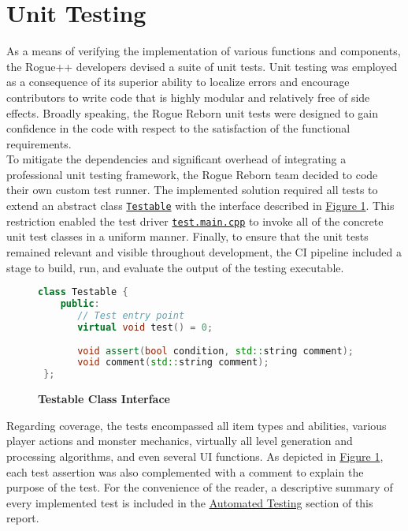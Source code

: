 \documentclass[12pt, titlepage]{article}
\newcommand{\newsection}[1]{\newpage\section{#1}}
\begin{document}
\newsection{Unit Testing} \label{Section_UT}
	As a means of verifying the implementation of various functions and components, the Rogue++ developers devised a suite of unit tests.  Unit testing was employed as a consequence of its superior ability to localize errors and encourage contributors to write code that is highly modular and relatively free of side effects.  Broadly speaking, the Rogue Reborn unit tests were designed to gain confidence in the code with respect to the satisfaction of the functional requirements.\\

	To mitigate the dependencies and significant overhead of integrating a professional unit testing framework, the Rogue Reborn team decided to code their own custom test runner.  The implemented solution required all tests to extend an abstract class \href{run:../../src/test.testable.h}{\lstinline$Testable$} with the interface described in \hyperref[Figure_Testable]{Figure 1}.  This restriction enabled the test driver \href{run:../../src/test.main.cpp}{\lstinline$test.main.cpp$} to invoke all of the concrete unit test classes in a uniform manner.  Finally, to ensure that the unit tests remained relevant and visible throughout development, the CI pipeline included a stage to build, run, and evaluate the output of the testing executable.

	\begin{figure}[H] \label{Figure_Testable}
		\caption{\bf Testable Class Interface}
		\centering
		\begin{lstlisting}[language=C++]
 class Testable {
    public:
       // Test entry point
       virtual void test() = 0;
            
       void assert(bool condition, std::string comment);
       void comment(std::string comment);
 };
		\end{lstlisting}
	\end{figure} 

	Regarding coverage, the tests encompassed all item types and abilities, various player actions and monster mechanics, virtually all level generation and processing algorithms, and even several UI functions.  As depicted in \hyperref[Figure_Testable]{Figure 1}, each test assertion was also complemented with a comment to explain the purpose of the test.  For the convenience of the reader, a descriptive summary of every implemented test is included in the \hyperref[Section_Automated]{Automated Testing} section of this report.\\
\end{document}
